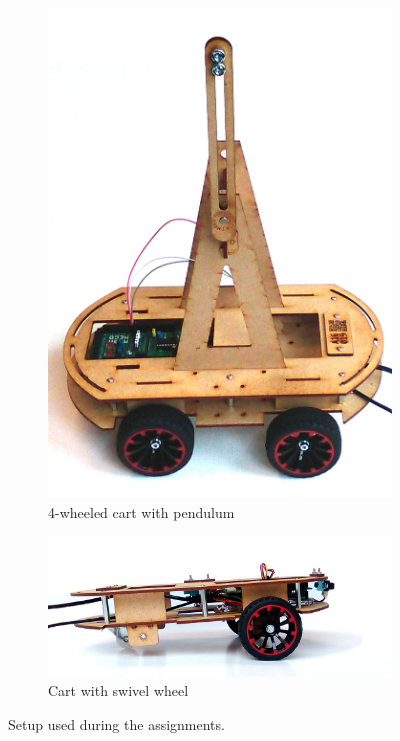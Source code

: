 \documentclass[10pt,a4paper]{article}
\begin{document}
\begin{figure}
  \centering
  \begin{subfigure}[c]{0.46\columnwidth}
    \centering
    \includegraphics[scale=0.1]{figures/pendulum.jpg}
    \caption{4-wheeled cart with pendulum}
  \end{subfigure}
  \begin{subfigure}[c]{0.46\columnwidth}
    \centering
    \includegraphics[scale=0.4]{figures/swivel.jpg}
    \caption{Cart with swivel wheel}
  \end{subfigure}
\caption{Setup used during the assignments.}
\label{fig:cart}
\end{figure}
\end{document}
